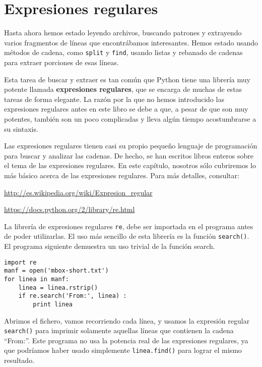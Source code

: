 
\chapter{Expresiones regulares}

Hasta ahora hemos estado leyendo archivos, buscando patrones y extrayendo varios
fragmentos de líneas que encontrábamos interesantes. Hemos estado usando métodos de cadena, como {\tt split}
y {\tt find}, usando listas y rebanado de cadenas para extraer porciones de esas líneas.

Esta tarea de buscar y extraer es tan común que Python tiene una librería muy potente
llamada {\bf expresiones regulares}, que se encarga de muchas de estas tareas de forma elegante. La
razón por la que no hemos introducido las expresiones regulares antes en este libro se debe a que,
a pesar de que son muy potentes, también son un poco complicadas y lleva algún tiempo acostumbrarse a su
sintaxis.

Las expresiones regulares tienen casi su propio pequeño lenguaje de programación para buscar y analizar
las cadenas. De hecho, se han escritos libros enteros sobre el tema de las expresiones regulares.
En este capítulo, nosotros sólo cubriremos lo más básico acerca de las expresiones regulares.
Para más detalles, consultar:

\url{http://es.wikipedia.org/wiki/Expresion_regular}

\url{https://docs.python.org/2/library/re.html}

La librería de expresiones regulares {\tt re}, debe ser importada en el programa antes de poder utilizarlas.
El uso más sencillo de esta librería es la función {\tt search()}. El programa siguiente
demuestra un uso trivial de la función search.

\beforeverb
\begin{verbatim}
import re
manf = open('mbox-short.txt')
for linea in manf:
    linea = linea.rstrip()
    if re.search('From:', linea) :
        print linea
\end{verbatim}
\afterverb
%
Abrimos el fichero, vamos recorriendo cada línea, y usamos la expresión regular {\tt search()} para
imprimir solamente aquellas líneas que contienen la cadena ``From:''. Este programa no usa la potencia
real de las expresiones regulares, ya que podríamos haber usado simplemente {\tt linea.find()} para
lograr el mismo resultado.


